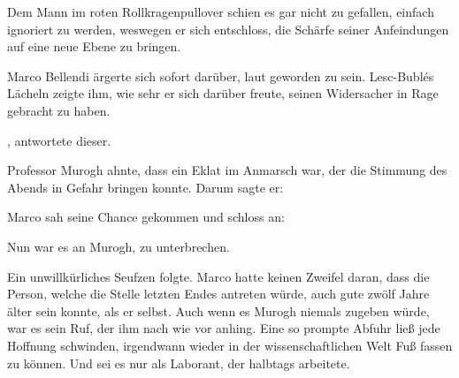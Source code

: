 \par

Dem Mann im roten Rollkragenpullover schien es gar nicht zu gefallen, einfach ignoriert zu werden, weswegen er sich entschloss, die Schärfe seiner Anfeindungen auf eine neue Ebene zu bringen. 

\par

 Marco Bellendi ärgerte sich sofort darüber, laut geworden zu sein. Lesc-Bublés Lächeln zeigte ihm, wie sehr er sich darüber freute, seinen Widersacher in Rage gebracht zu haben.

\par

, antwortete dieser. 

\par

Professor Murogh ahnte, dass ein Eklat im Anmarsch war, der die Stimmung des Abends in Gefahr bringen konnte. Darum sagte er: 

\par

Marco sah seine Chance gekommen und schloss an: 

\par

Nun war es an Murogh, zu unterbrechen. 

\par

Ein unwillkürliches Seufzen folgte. Marco hatte keinen Zweifel daran, dass die Person, welche die Stelle letzten Endes antreten würde, auch gute zwölf Jahre älter sein konnte, als er selbst. Auch wenn es Murogh niemals zugeben würde, war es sein Ruf, der ihm nach wie vor anhing. Eine so prompte Abfuhr ließ jede Hoffnung schwinden, irgendwann wieder in der wissenschaftlichen Welt Fuß fassen zu können. Und sei es nur als Laborant, der halbtags arbeitete.

